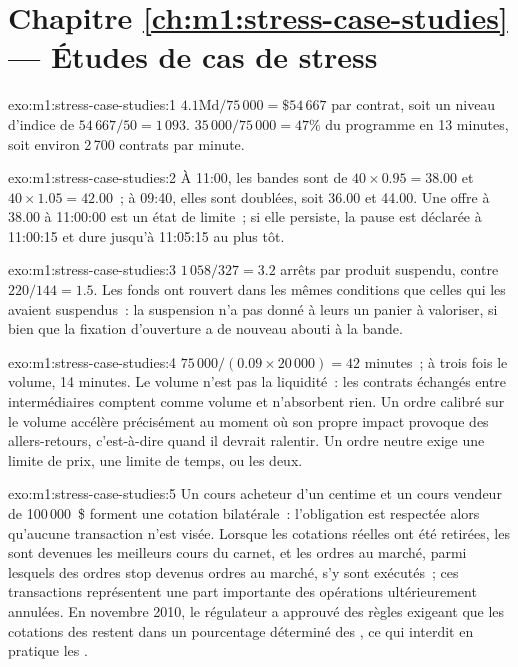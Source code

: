 \section*{Chapitre \ref{ch:m1:stress-case-studies} --- Études de cas de stress}

\begin{solution}{exo:m1:stress-case-studies:1}
$4.1\text{Md}/75\,000 = \$54\,667$ par contrat, soit un niveau d'indice de $54\,667/50 =
1\,093$. $35\,000/75\,000 = 47\%$ du programme en 13 minutes, soit environ 2\,700
contrats par minute.
\end{solution}

\begin{solution}{exo:m1:stress-case-studies:2}
À 11:00, les bandes sont de $40 \times 0.95 = 38.00$ et $40 \times 1.05 = 42.00$~; à
09:40, elles sont doublées, soit 36.00 et 44.00. Une offre à 38.00 à 11:00:00 est un
état de limite~; si elle persiste, la pause est déclarée à 11:00:15 et dure
jusqu'à 11:05:15 au plus tôt.
\end{solution}

\begin{solution}{exo:m1:stress-case-studies:3}
$1\,058/327 = 3.2$ arrêts par produit suspendu, contre $220/144 = 1.5$. Les fonds
ont rouvert dans les mêmes conditions que celles qui les avaient suspendus~: la
suspension n'a pas donné à leurs  un panier à valoriser, si bien
que la fixation d'ouverture a de nouveau abouti à la bande.
\end{solution}

\begin{solution}{exo:m1:stress-case-studies:4}
$75\,000/(0.09 \times 20\,000) = 42$ minutes~; à trois fois le volume, 14
minutes. Le volume n'est pas la liquidité~: les contrats échangés entre
intermédiaires comptent comme volume et n'absorbent rien. Un ordre calibré sur le volume
accélère précisément au moment où son propre impact provoque des allers-retours, c'est-à-dire quand il devrait ralentir.
Un ordre neutre exige une limite de prix, une limite de temps, ou les deux.
\end{solution}

\begin{solution}{exo:m1:stress-case-studies:5}
Un cours acheteur d'un centime et un cours vendeur de 100\,000~\$ forment une cotation
bilatérale~: l'obligation est respectée alors qu'aucune transaction n'est visée. Lorsque les cotations réelles
ont été retirées, les  sont devenues les meilleurs cours du carnet, et les ordres au marché,
parmi lesquels des ordres stop devenus ordres au marché, s'y sont exécutés~; ces transactions représentent une part
importante des opérations ultérieurement annulées. En novembre 2010, le régulateur a
approuvé des règles exigeant que les cotations des  restent dans un pourcentage déterminé
des , ce qui
interdit en pratique les .
\end{solution}

